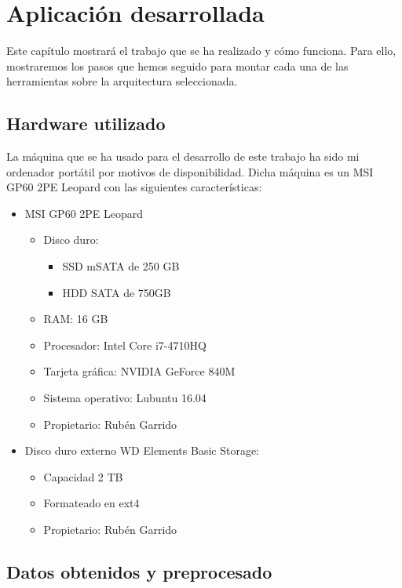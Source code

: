 \chapter{Aplicación desarrollada\label{desarrollo}}

Este capítulo mostrará el trabajo que se ha realizado y cómo funciona.
Para ello, mostraremos los pasos que hemos seguido para montar cada
una de las herramientas sobre la arquitectura seleccionada.

\section{Hardware utilizado\label{hardware}}

La máquina que se ha usado para el desarrollo de este trabajo ha sido
mi ordenador portátil por motivos de disponibilidad. Dicha máquina es
un MSI GP60 2PE Leopard con las siguientes características:

\begin{itemize}
\item MSI GP60 2PE Leopard
  \begin{itemize}
  \item Disco duro:
    \begin{itemize}
    \item SSD mSATA de 250 GB
    \item HDD SATA de 750GB
    \end{itemize}
  \item RAM: 16 GB
  \item Procesador: Intel Core i7-4710HQ
  \item Tarjeta gráfica: NVIDIA GeForce 840M
  \item Sistema operativo: Lubuntu 16.04
  \item Propietario: Rubén Garrido
  \end{itemize}
\item Disco duro externo WD Elements Basic Storage:
  \begin{itemize}
  \item Capacidad 2 TB
  \item Formateado en ext4
  \item Propietario: Rubén Garrido
  \end{itemize}
\end{itemize}

\section{Datos obtenidos y preprocesado\label{datos}}

